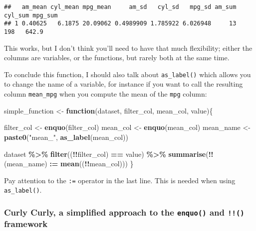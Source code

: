 \documentclass[
]{article}
\newenvironment{Shaded}{\begin{snugshade}}{\end{snugshade}}
\newcommand{\ControlFlowTok}[1]{\textcolor[rgb]{0.13,0.29,0.53}{\textbf{#1}}}
\newcommand{\ErrorTok}[1]{\textcolor[rgb]{0.64,0.00,0.00}{\textbf{#1}}}
\newcommand{\KeywordTok}[1]{\textcolor[rgb]{0.13,0.29,0.53}{\textbf{#1}}}
\newcommand{\NormalTok}[1]{#1}
\newcommand{\OperatorTok}[1]{\textcolor[rgb]{0.81,0.36,0.00}{\textbf{#1}}}
\newcommand{\StringTok}[1]{\textcolor[rgb]{0.31,0.60,0.02}{#1}}
\begin{document}
\begin{verbatim}
##   am_mean cyl_mean mpg_mean     am_sd   cyl_sd   mpg_sd am_sum cyl_sum mpg_sum
## 1 0.40625   6.1875 20.09062 0.4989909 1.785922 6.026948     13     198   642.9
\end{verbatim}

This works, but I don't think you'll need to have that much flexibility; either the columns
are variables, or the functions, but rarely both at the same time.

To conclude this function, I should also talk about \texttt{as\_label()} which allows you to change the
name of a variable, for instance if you want to call the resulting column \texttt{mean\_mpg} when you
compute the mean of the \texttt{mpg} column:

\begin{Shaded}
\begin{Highlighting}[]
\NormalTok{simple\_function \textless{}{-}}\StringTok{ }\ControlFlowTok{function}\NormalTok{(dataset, filter\_col, mean\_col, value)\{}

\NormalTok{  filter\_col \textless{}{-}}\StringTok{ }\KeywordTok{enquo}\NormalTok{(filter\_col)}
\NormalTok{  mean\_col \textless{}{-}}\StringTok{ }\KeywordTok{enquo}\NormalTok{(mean\_col)}
\NormalTok{  mean\_name \textless{}{-}}\StringTok{ }\KeywordTok{paste0}\NormalTok{(}\StringTok{"mean\_"}\NormalTok{, }\KeywordTok{as\_label}\NormalTok{(mean\_col))}
  
\NormalTok{  dataset }\OperatorTok{\%\textgreater{}\%}
\StringTok{    }\KeywordTok{filter}\NormalTok{((}\OperatorTok{!!}\NormalTok{filter\_col) }\OperatorTok{==}\StringTok{ }\NormalTok{value) }\OperatorTok{\%\textgreater{}\%}
\StringTok{    }\KeywordTok{summarise}\NormalTok{(}\OperatorTok{!!}\NormalTok{(mean\_name) }\OperatorTok{:}\ErrorTok{=}\StringTok{ }\KeywordTok{mean}\NormalTok{((}\OperatorTok{!!}\NormalTok{mean\_col)))}
\NormalTok{\}}
\end{Highlighting}
\end{Shaded}

Pay attention to the \texttt{:=} operator in the last line. This is needed when using \texttt{as\_label()}.

\hypertarget{curly-curly-a-simplified-approach-to-the-enquo-and-framework}{%
\subsubsection{\texorpdfstring{Curly Curly, a simplified approach to the \texttt{enquo()} and \texttt{!!()} framework}{Curly Curly, a simplified approach to the enquo() and !!() framework}}\label{curly-curly-a-simplified-approach-to-the-enquo-and-framework}}
\end{document}
